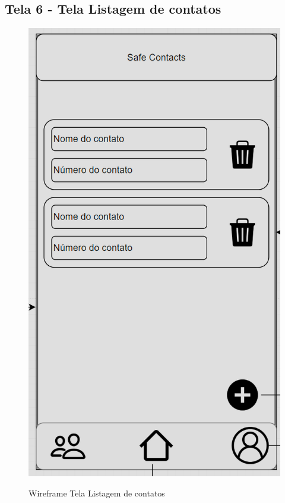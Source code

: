 \subsection{Tela 6 - Tela Listagem de contatos}
\begin{figure}[h]
  \begin{center}
  \includegraphics[width=0.7\linewidth]{images/wire-tela-listagem-contatos.png}\\
  \end{center}
  \caption[Wireframe Tela Listagem de contatos]{Wireframe Tela Listagem de contatos}
  \label{fig:wireframe-tela-listagem-contatos}
\end{figure}
\clearpage
